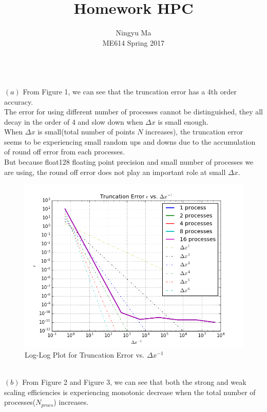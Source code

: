 \documentclass[12pt]{article}
\newenvironment{problem}[2][Problem]{\begin{trivlist}
\item[\hskip \labelsep {\bfseries #1}\hskip \labelsep {\bfseries #2.}]}{\end{trivlist}}
\begin{document}
 
\title{Homework HPC}
\author{Ningyu Ma\\ 
ME614 Spring 2017}

\maketitle
\begin{problem}{1}
\text{}\\
$(a)$ From Figure 1, we can see that the truncation error has a 4th order accuracy.\\
The error for using different number of processes cannot be distinguished, they all decay in the order of 4 and slow down when $\Delta x$ is small enough.\\
When $\Delta x$ is small(total number of points $N$ increases), the truncation error seems to be experiencing small random ups and downs due to the accumulation of round off error from each processes. \\
But because float128 floating point precision and small number of processes we are using, the round off error does not play an important role at small  $\Delta x$.\\
\begin{figure}[H]
\centering
  \includegraphics[scale=0.65]{part_a.png}
 \caption{Log-Log Plot for Truncation Error vs. $\Delta x^{-1}$}
\label{label}
\end{figure}
\text{}\\
$(b)$ From Figure 2 and Figure 3, we can see that both the strong and weak scaling efficiencies is experiencing monotonic decrease when the total number of processes($N_{procs}$) increases.\\

\end{problem}
\end{document}
